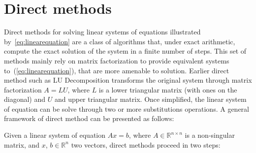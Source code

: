 
\section{Direct methods}

Direct methods for solving linear systems of equations illustrated by~\ref{eq:linearequation} are a class of algorithms that, under exact arithmetic, compute the exact solution of the system in a finite number of steps. This set of methods mainly rely on matrix factorization to provide equivalent systems to~(\ref{eq:linearequation}), that are more amenable to solution. Earlier direct method such as LU Decomposition transforms the original system through matrix factorization $A = LU $, where $L$ is a lower triangular matrix (with ones on the diagonal) and $U$ and upper triangular matrix. Once simplified, the linear system of equation can be solve through two or more substitutions operations. A general framework of direct method can be presented as follows:

Given a linear system of equation $Ax = b$, where $A \in \mathbb{R}^{n \times n}$ is a non-singular matrix, and $x$, $b \in \mathbb{R}^{n}$ two vectors, direct methods proceed in two steps:

